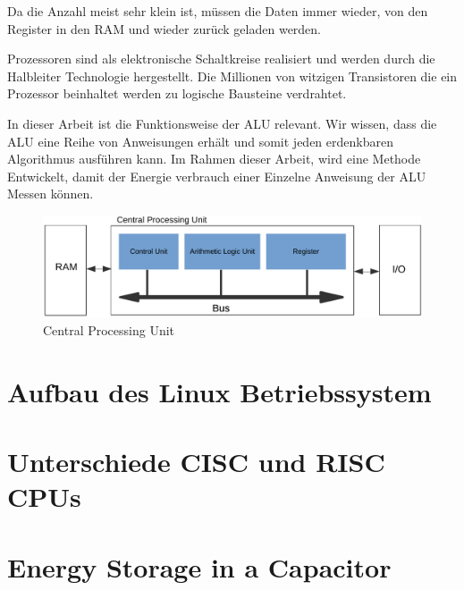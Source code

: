 Da die Anzahl meist sehr klein ist, müssen die Daten immer wieder, von den Register in den RAM und wieder zurück geladen werden.
\par
Prozessoren sind als elektronische Schaltkreise realisiert und werden durch die Halbleiter Technologie hergestellt. Die Millionen von witzigen Transistoren die ein Prozessor beinhaltet werden zu logische Bausteine verdrahtet.
\par
In dieser Arbeit ist die Funktionsweise der ALU relevant. Wir wissen, dass die ALU eine Reihe von Anweisungen erhält und somit jeden erdenkbaren Algorithmus ausführen kann. Im Rahmen dieser Arbeit, wird eine Methode Entwickelt, damit der Energie verbrauch einer Einzelne Anweisung der ALU Messen können.



\begin{figure}[t]
\centering
\includegraphics[width=1.0\textwidth]{images/cpu.pdf}
\caption{Central Processing Unit}
\label{fig:CPU}
\end{figure}

\section{Aufbau des Linux Betriebssystem}


\section{Unterschiede CISC und RISC CPUs}



\section{Energy Storage in a Capacitor}



